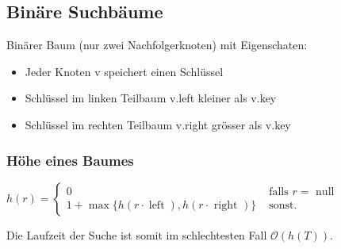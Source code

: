 \documentclass[german]{latex4ei/latex4ei_sheet}
\begin{document}
\begin{sectionbox}
\subsection{Binäre Suchbäume}\smallskip
Binärer Baum (nur zwei Nachfolgerknoten) mit Eigenschaten:\par
\begin{itemize}
    \item Jeder Knoten v speichert einen Schlüssel
    \item Schlüssel im linken Teilbaum v.left kleiner als v.key
    \item Schlüssel im rechten Teilbaum v.right grösser als v.key
\end{itemize}\vspace{7px}

\subsubsection{Höhe eines Baumes}\smallskip
$h(r)=\left\{\begin{array}{ll}0 & \text { falls } r=\text { null } \\ 1+\max \{h(r \cdot \operatorname{left}), h(r \cdot \text { right })\} & \text { sonst. }\end{array}\right.$\par\smallskip
Die Laufzeit der Suche ist somit im schlechtesten Fall $\mathcal{O}(h(T))$.\par\smallskip
\end{sectionbox}
\end{document}

